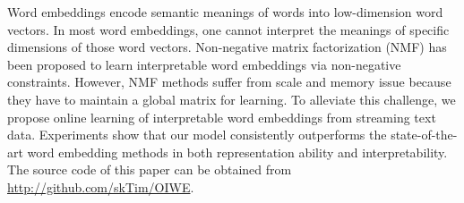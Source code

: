 Word embeddings encode semantic meanings of words into low-dimension word vectors. In most word embeddings, one cannot interpret the meanings of specific dimensions of those word vectors. Non-negative matrix factorization (NMF) has been proposed to learn interpretable word embeddings via non-negative constraints. However, NMF methods suffer from scale and memory issue because they have to maintain a global matrix for learning. To alleviate this challenge, we propose online learning of interpretable word embeddings from streaming text data. Experiments show that our model consistently outperforms the state-of-the-art word embedding methods in both representation ability and interpretability. The source code of this paper can be obtained from \url{http://github.com/skTim/OIWE}.
